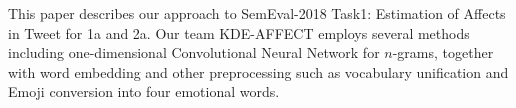This paper describes our approach to SemEval-2018 Task1: Estimation of Affects in Tweet for 1a and 2a. Our team KDE-AFFECT employs several methods including one-dimensional Convolutional Neural Network for $n$-grams, together with word embedding and other preprocessing such as vocabulary unification and Emoji conversion into four emotional words.
